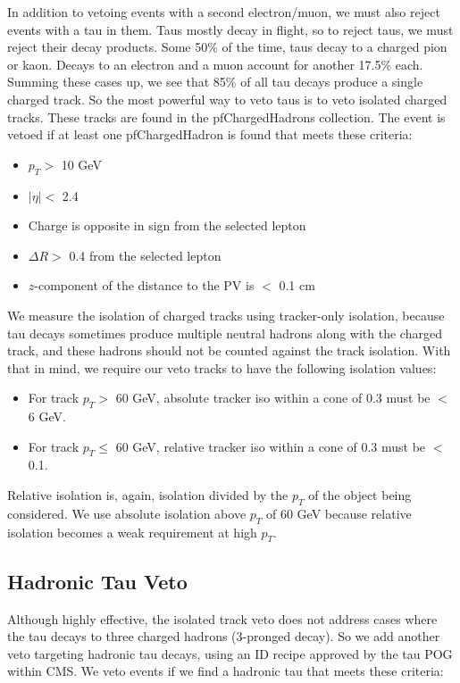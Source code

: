In addition to vetoing events with a second electron/muon, we must
also reject events with a tau in them. Taus mostly decay in flight, so
to reject taus, we must reject their decay products. Some 50\% of the
time, taus decay to a charged pion or kaon. Decays to an electron and
a muon account for another 17.5\% each. Summing these cases up, we see
that 85\% of all tau decays produce a single charged track. So the
most powerful way to veto taus is to veto isolated charged
tracks. These tracks are found in the pfChargedHadrons collection. The
event is vetoed if at least one pfChargedHadron is found that meets these
criteria:
\begin{itemize}
\item $p_T >$ 10 GeV
\item $|\eta| <$ 2.4
\item Charge is opposite in sign from the selected lepton
\item $\Delta R >$ 0.4 from the selected lepton
\item $z$-component of the distance to the PV is $<$ 0.1 cm
\end{itemize}
We measure the isolation of charged tracks using tracker-only
isolation, because tau decays sometimes produce multiple neutral
hadrons along with the charged track, and these hadrons should not be
counted against the track isolation. With that in mind, we require our
veto tracks to have the following isolation values:
\begin{itemize}
\item For track $p_T >$ 60 GeV, absolute tracker iso within a cone of
  0.3 must be $<$ 6 GeV.
\item For track $p_T \leq$ 60 GeV, relative tracker iso within a cone
  of 0.3 must be  $<$ 0.1.
\end{itemize}
Relative isolation is, again, isolation divided by the $p_T$ of the
object being considered. We use absolute isolation above $p_T$ of 60
GeV because relative isolation becomes a weak requirement at high
$p_T$.

\subsection{Hadronic Tau Veto}
\label{ssec:stop:hadtauveto}

Although highly effective, the isolated track veto does not address
cases where the tau decays to three charged hadrons (3-pronged
decay). So we add another veto targeting hadronic tau decays, using an
ID recipe approved by the tau POG within CMS. We veto events if we
find a hadronic tau that meets these criteria:

